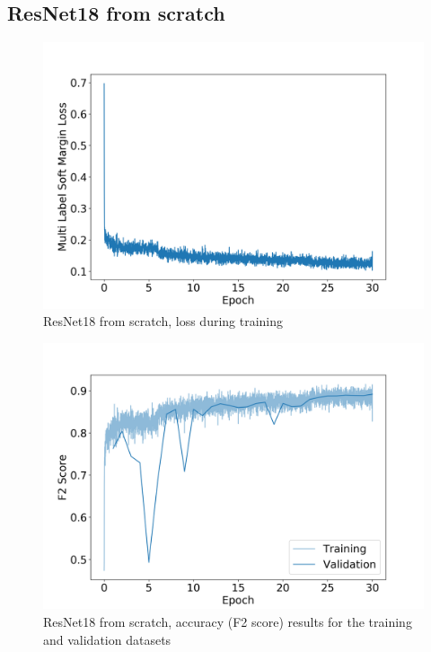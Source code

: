 \documentclass[10pt,twocolumn,letterpaper]{article}
\begin{document}
\subsection*{ResNet18 from scratch}

\begin{figure}
	\includegraphics[width=\columnwidth]{fig/plot_loss_resnet18_rgb.png}
    \caption{ResNet18 from scratch, loss during training}
    \label{fig:plot_loss_resnet18_rgb}
\end{figure}

\begin{figure}[t]
    \includegraphics[width=\columnwidth]{fig/plot_validation_accuracy_resnet18_rgb.png}
    \caption{ResNet18 from scratch, accuracy (F2 score) results for the training and validation datasets}
    \label{fig:plot_validation_accuracy_resnet18_rgb}
\end{figure}
\end{document}
